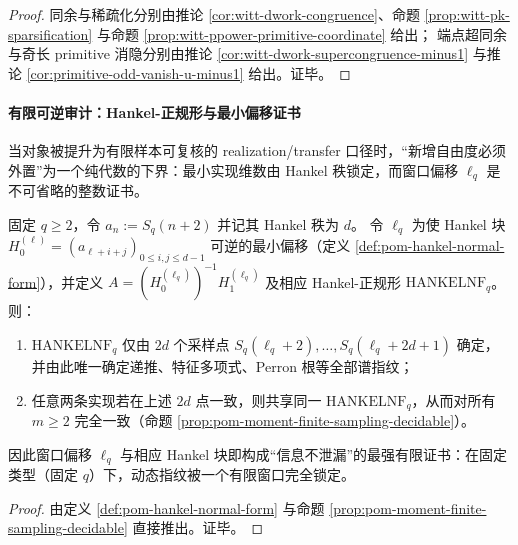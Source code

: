 \begin{proof}
同余与稀疏化分别由推论 \ref{cor:witt-dwork-congruence}、命题 \ref{prop:witt-pk-sparsification} 与命题 \ref{prop:witt-ppower-primitive-coordinate} 给出；
端点超同余与奇长 primitive 消隐分别由推论 \ref{cor:witt-dwork-supercongruence-minus1} 与推论 \ref{cor:primitive-odd-vanish-u-minus1} 给出。证毕。
\end{proof}

\paragraph{有限可逆审计：Hankel-正规形与最小偏移证书}
当对象被提升为有限样本可复核的 realization/transfer 口径时，“新增自由度必须外置”为一个纯代数的下界：最小实现维数由 Hankel 秩锁定，而窗口偏移 \(\ell_q\) 是不可省略的整数证书。

\begin{theorem}\label{thm:dephys-hankel-finite-audit}
固定 \(q\ge 2\)，令 \(a_n:=S_q(n+2)\) 并记其 Hankel 秩为 \(d\)。
令 \(\ell_q\) 为使 Hankel 块 \(H_0^{(\ell)}=(a_{\ell+i+j})_{0\le i,j\le d-1}\) 可逆的最小偏移（定义 \ref{def:pom-hankel-normal-form}），并定义
\(
A=(H_0^{(\ell_q)})^{-1}H_1^{(\ell_q)}
\)
及相应 Hankel-正规形 \(\mathrm{HANKELNF}_q\)。
则：
\begin{enumerate}
  \item \(\mathrm{HANKELNF}_q\) 仅由 \(2d\) 个采样点 \(S_q(\ell_q+2),\dots,S_q(\ell_q+2d+1)\) 确定，并由此唯一确定递推、特征多项式、Perron 根等全部谱指纹；
  \item 任意两条实现若在上述 \(2d\) 点一致，则共享同一 \(\mathrm{HANKELNF}_q\)，从而对所有 \(m\ge 2\) 完全一致（命题 \ref{prop:pom-moment-finite-sampling-decidable}）。
\end{enumerate}
因此窗口偏移 \(\ell_q\) 与相应 Hankel 块即构成“信息不泄漏”的最强有限证书：在固定类型（固定 \(q\)）下，动态指纹被一个有限窗口完全锁定。
\end{theorem}

\begin{proof}
由定义 \ref{def:pom-hankel-normal-form} 与命题 \ref{prop:pom-moment-finite-sampling-decidable} 直接推出。证毕。
\end{proof}




